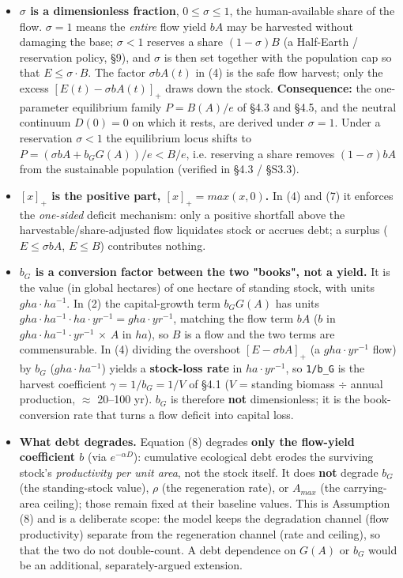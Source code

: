 \documentclass[11pt]{article}
\begin{document}
\begin{itemize}
\item \textbf{$\sigma{}$ is a dimensionless fraction}, $0 \leq{} \sigma{} \leq{} 1$, the human-available share of the flow. $\sigma{} = 1$ means the \emph{entire} flow yield $bA$ may be harvested without damaging the base; $\sigma{} < 1$ reserves a share $(1-\sigma{})B$ (a Half-Earth / reservation policy, §9), and $\sigma{}$ is then set together with the population cap so that $E \leq{} \sigma{}\cdot{}B$. The factor $\sigma{} b A(t)$ in (4) is the safe flow harvest; only the excess $[E(t) - \sigma{} b A(t)]_{+}$ draws down the stock. \textbf{Consequence:} the one-parameter equilibrium family $P = B(A)/e$ of §4.3 and §4.5, and the neutral continuum $D(0)=0$ on which it rests, are derived under $\sigma{} = 1$. Under a reservation $\sigma{} < 1$ the equilibrium locus shifts to $P = (\sigma{}bA + b_{G} G(A))/e < B/e$, i.e. reserving a share removes $(1-\sigma{})bA$ from the sustainable population (verified in §4.3 / §S3.3).
\item \textbf{$[x]_{+}$ is the positive part, $[x]_{+} = max(x, 0)$.} In (4) and (7) it enforces the \emph{one-sided} deficit mechanism: only a positive shortfall above the harvestable/share-adjusted flow liquidates stock or accrues debt; a surplus ($E \leq{} \sigma{}bA$, $E \leq{} B$) contributes nothing.
\item \textbf{$b_{G}$ is a conversion factor between the two "books", not a yield.} It is the value (in global hectares) of one hectare of standing stock, with units $gha\cdot{}ha^{-1}$. In (2) the capital-growth term $b_{G} G(A)$ has units $gha\cdot{}ha^{-1} \cdot{} ha\cdot{}yr^{-1} = gha\cdot{}yr^{-1}$, matching the flow term $bA$ ($b$ in $gha\cdot{}ha^{-1}\cdot{}yr^{-1}$ \ensuremath{\times{}} $A$ in $ha$), so $B$ is a flow and the two terms are commensurable. In (4) dividing the overshoot $[E - \sigma{}bA]_{+}$ (a $gha\cdot{}yr^{-1}$ flow) by $b_{G}$ ($gha\cdot{}ha^{-1}$) yields a \textbf{stock-loss rate} in $ha\cdot{}yr^{-1}$, so \texttt{1/b\_G} is the harvest coefficient $\gamma{} = 1/b_{G} = 1/V$ of §4.1 ($V$ = standing biomass \ensuremath{\div{}} annual production, \ensuremath{\approx{}} 20–100 yr). $b_{G}$ is therefore \textbf{not} dimensionless; it is the book-conversion rate that turns a flow deficit into capital loss.
\item \textbf{What debt degrades.} Equation (8) degrades \textbf{only the flow-yield coefficient $b$} (via $e^{-\alpha{}D}$): cumulative ecological debt erodes the surviving stock's \emph{productivity per unit area}, not the stock itself. It does \textbf{not} degrade $b_{G}$ (the standing-stock value), $\rho{}$ (the regeneration rate), or $A_{max}$ (the carrying-area ceiling); those remain fixed at their baseline values. This is Assumption (8) and is a deliberate scope: the model keeps the degradation channel (flow productivity) separate from the regeneration channel (rate and ceiling), so that the two do not double-count. A debt dependence on $G(A)$ or $b_{G}$ would be an additional, separately-argued extension.
\end{itemize}
\end{document}
